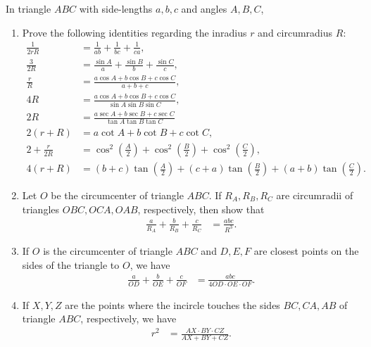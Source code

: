 \begin{tcolorbox}[title={Makshud's Exercises on Circumcircle and Incircle}]
    \begin{question}[name={Makshud's Identities on Circumradius and Inradius}]
        In triangle $ABC$ with side-lengths $a,b,c$ and angles $A,B,C$, 
        \begin{enumerate}
            \item Prove the following identities regarding the inradius $r$ and circumradius $R$:
            \begin{align*}
            \frac{1}{2rR} &= \frac{1}{ab}+\frac{1}{bc}+\frac{1}{ca},\\
            \frac{3}{2R} &= \frac{\sin A}{a}+\frac{\sin B}{b}+\frac{\sin C}{c},\\
            \frac{r}{R} &= \frac{a\cos A + b\cos B + c\cos C}{a+b+c},\\
            4R &= \frac{a\cos A + b\cos B + c\cos C}{\sin A \sin B \sin C},\\
            2R &= \frac{a\sec A + b\sec B + c\sec C}{\tan A \tan B \tan C}\\
            2(r+R) &= a\cot A + b\cot B + c\cot C,\\
            2+\frac{r}{2R} &= \cos^2\left(\frac{A}{2}\right)+\cos^2\left(\frac{B}{2}\right)+\cos^2\left(\frac{C}{2}\right),\\
            4(r+R) &= (b+c)\tan\left(\frac{A}{2}\right) + (c+a)\tan\left(\frac{B}{2}\right) + (a+b)\tan\left(\frac{C}{2}\right).
            \end{align*}
            \item Let $O$ be the circumcenter of triangle $ABC$. If $R_A, R_B, R_C$ are circumradii of triangles $OBC, OCA, OAB$, respectively, then show that
            \begin{align*}
                \frac{a}{R_A} + \frac{b}{R_B} + \frac{c}{R_C} &= \frac{abc}{R^3}.
            \end{align*}
            \item If $O$ is the circumcenter of triangle $ABC$ and $D,E,F$ are closest points on the sides of the triangle to $O$, we have
            \begin{align*}
                \frac{a}{OD}+\frac{b}{OE}+\frac{c}{OF} &= \frac{abc}{4OD\cdot OE \cdot OF}.
            \end{align*}
            \item If $X,Y,Z$ are the points where the incircle touches the sides $BC, CA, AB$ of triangle $ABC$, respectively, we have
            \begin{align*}
                r^2 &= \frac{AX \cdot BY \cdot CZ}{AX+BY+CZ}.
            \end{align*}
        \end{enumerate}
    \end{question}
\end{tcolorbox}

